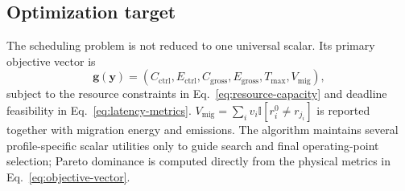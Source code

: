 \subsection{Optimization target}

The scheduling problem is not reduced to one universal scalar. Its primary objective vector is
\begin{equation}
\mathbf{g}(\mathbf{y})=
\left(C_{\mathrm{ctrl}},E_{\mathrm{ctrl}},C_{\mathrm{gross}},E_{\mathrm{gross}},T_{\max},V_{\mathrm{mig}}\right),
\label{eq:objective-vector}
\end{equation}
subject to the resource constraints in Eq.~\eqref{eq:resource-capacity} and deadline feasibility in Eq.~\eqref{eq:latency-metrics}. $V_{\mathrm{mig}}=\sum_i v_i\mathbb{I}[r_i^0\neq r_{j_i}]$ is reported together with migration energy and emissions. The algorithm maintains several profile-specific scalar utilities only to guide search and final operating-point selection; Pareto dominance is computed directly from the physical metrics in Eq.~\eqref{eq:objective-vector}.
